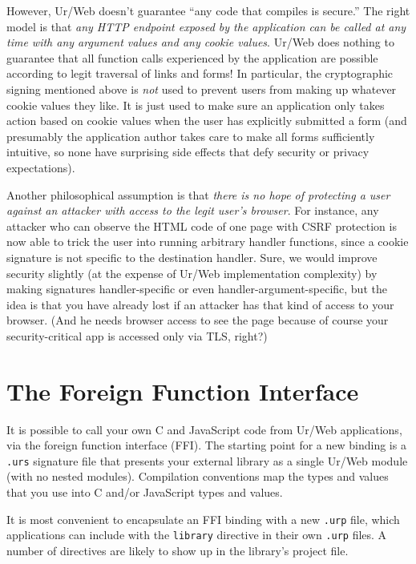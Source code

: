 \documentclass{article}
\begin{document}
However, Ur/Web doesn't guarantee ``any code that compiles is secure.''  The right model is that \emph{any HTTP endpoint exposed by the application can be called at any time with any argument values and any cookie values}.  Ur/Web does nothing to guarantee that all function calls experienced by the application are possible according to legit traversal of links and forms!  In particular, the cryptographic signing mentioned above is \emph{not} used to prevent users from making up whatever cookie values they like.  It is just used to make sure an application only takes action based on cookie values when the user has explicitly submitted a form (and presumably the application author takes care to make all forms sufficiently intuitive, so none have surprising side effects that defy security or privacy expectations).

Another philosophical assumption is that \emph{there is no hope of protecting a user against an attacker with access to the legit user's browser}.  For instance, any attacker who can observe the HTML code of one page with CSRF protection is now able to trick the user into running arbitrary handler functions, since a cookie signature is not specific to the destination handler.  Sure, we would improve security slightly (at the expense of Ur/Web implementation complexity) by making signatures handler-specific or even handler-argument-specific, but the idea is that you have already lost if an attacker has that kind of access to your browser.  (And he needs browser access to see the page because of course your security-critical app is accessed only via TLS, right?)


\section{\label{ffi}The Foreign Function Interface}

It is possible to call your own C and JavaScript code from Ur/Web applications, via the foreign function interface (FFI).  The starting point for a new binding is a \texttt{.urs} signature file that presents your external library as a single Ur/Web module (with no nested modules).  Compilation conventions map the types and values that you use into C and/or JavaScript types and values.

It is most convenient to encapsulate an FFI binding with a new \texttt{.urp} file, which applications can include with the \texttt{library} directive in their own \texttt{.urp} files.  A number of directives are likely to show up in the library's project file.
\end{document}
